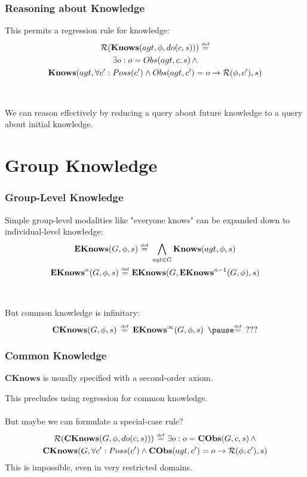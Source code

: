 \documentclass[compress]{beamer}
\newcommand{\isdef}{\hbox{$\stackrel{\mbox{\tiny def}}{=}$}}
\newcommand{\Reg}{\mathcal{R}}
\newcommand{\EKnows}{\mathbf{EKnows}}
\newcommand{\Knows}{\mathbf{Knows}}
\newcommand{\CKnows}{\mathbf{CKnows}}
\begin{document}
\begin{frame}
\frametitle{Reasoning about Knowledge}
This permits a regression rule for knowledge:
\begin{multline*}
\Reg(\Knows(agt,\phi,do(c,s)))\,\,\isdef \\
  \exists o: o = Obs(agt,c,s)\,\wedge \\
  \Knows(agt,\forall c': Poss(c')\wedge Obs(agt,c')=o \rightarrow \Reg(\phi,c'),s)
\end{multline*}
\ \\
\ \\
We can reason effectively by reducing a query about future knowledge to a query about initial knowledge.
\end{frame}

\section{Group Knowledge}

\begin{frame}
\frametitle{Group-Level Knowledge}
Simple group-level modalities like "everyone knows" can be expanded down to individual-level knowledge:
\begin{gather*}
\EKnows(G,\phi,s)\,\,\isdef\,\,\bigwedge_{agt \in G} \Knows(agt,\phi,s)\\
\EKnows^{n}(G,\phi,s)\,\,\isdef\,\,\EKnows(G,\EKnows^{n-1}(G,\phi),s)
\end{gather*}
\ \\
\ \\
\pause
But common knowledge is infinitary:
\begin{equation*}
\CKnows(G,\phi,s)\,\,\,\isdef\,\,\,\EKnows^{\infty}(G,\phi,s)\,\,\,\pause \isdef\,\,\,???
\end{equation*}
\end{frame}

\begin{frame}
\frametitle{Common Knowledge}
$\CKnows$ is usually specified with a second-order axiom.

This precludes using regression for common knowledge.
\ \\
\ \\
\pause
But maybe we can formulate a special-case rule?
\begin{multline*}
\Reg(\CKnows(G,\phi,do(c,s)))\,\,\isdef\,\,\exists o: o = \mathbf{CObs}(G,c,s)\,\wedge \\
  \CKnows(G,\forall c': Poss(c')\wedge \mathbf{CObs}(agt,c')=o \rightarrow \Reg(\phi,c'),s)
\end{multline*}
\pause
This is \alert{impossible}, even in very restricted domains.
\end{frame}
\end{document}
